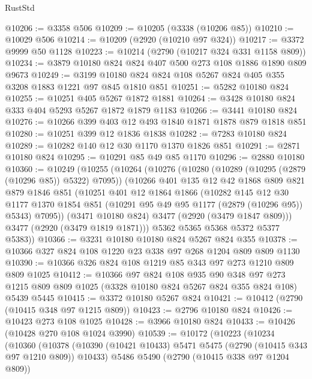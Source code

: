 \begin{lexlean}{RustStd}
\begin{coremodule}
@10206 := @3358 @506
@10209 := @10205 (@3338 (@10206 @85))
@10210 := @10029 @506
@10214 := @10209 (@2920 (@10210 @97 @324))
@10217 := @3372 @9999 @50 @1128
@10223 := @10214 (@2790 (@10217 @324 @331 @1158 @809))
@10234 := @3879 @10180 @824 @824 @407 @500 @273 @108 @1886 @1890 @809 @9673
@10249 := @3199 @10180 @824 @824 @108 @5267 @824 @405 @355 @3208 @1883 @1221 @97 @845 @1810 @851
@10251 := @5282 @10180 @824
@10255 := @10251 @405 @5267 @1872 @1881
@10264 := @3428 @10180 @824 @333 @404 @5293 @5267 @1872 @1879 @1183
@10266 := @3441 @10180 @824
@10276 := @10266 @399 @403 @12 @493 @1840 @1871 @1878 @879 @1818 @851
@10280 := @10251 @399 @12 @1836 @1838
@10282 := @7283 @10180 @824
@10289 := @10282 @140 @12 @30 @1170 @1370 @1826 @851
@10291 := @2871 @10180 @824
@10295 := @10291 @85 @49 @85 @1170
@10296 := @2880 @10180
@10360 := @10249
    (@10255
      (@10264
        (@10276
          (@10280 (@10289 (@10295 (@2879 (@10296 @85)) @5322) @7095))
          (@10266
            @401
            @135
            @12
            @42
            @1868
            @809
            @821
            @879
            @1846
            @851
            (@10251
              @401
              @12
              @1864
              @1866
              (@10282
                @145
                @12
                @30
                @1177
                @1370
                @1854
                @851
                (@10291 @95 @49 @95 @1177 (@2879 (@10296 @95)) @5343)
                @7095))
            (@3471 @10180 @824)
            @3477
            (@2920 (@3479 @1847 @809)))
          @3477
          (@2920 (@3479 @1819 @1871)))
        @5362
        @5365
        @5368
        @5372
        @5377
        @5383))
@10366 := @3231 @10180 @10180 @824 @5267 @824 @355
@10378 := @10366 @327 @824 @108 @1220 @23 @338 @97 @268 @1204 @809 @809 @1130
@10390 := @10366 @326 @824 @108 @1219 @85 @343 @97 @273 @1210 @809 @809 @1025
@10412 := @10366
    @97
    @824
    @108
    @935
    @90
    @348
    @97
    @273
    @1215
    @809
    @809
    @1025
    (@3328 @10180 @824 @5267 @824 @355 @824 @108)
    @5439
    @5445
@10415 := @3372 @10180 @5267 @824
@10421 := @10412 (@2790 (@10415 @348 @97 @1215 @809))
@10423 := @2796 @10180 @824
@10426 := @10423 @273 @108 @1025
@10428 := @3966 @10180 @824
@10433 := @10426 (@10428 @270 @108 @1024 @3990)
@10539 := @10172
    (@10223
      (@10234
        (@10360
          (@10378
            (@10390 (@10421 @10433) @5471 @5475 (@2790 (@10415 @343 @97 @1210 @809)) @10433)
            @5486
            @5490
            (@2790 (@10415 @338 @97 @1204 @809))

\end{coremodule}
\end{lexlean}
